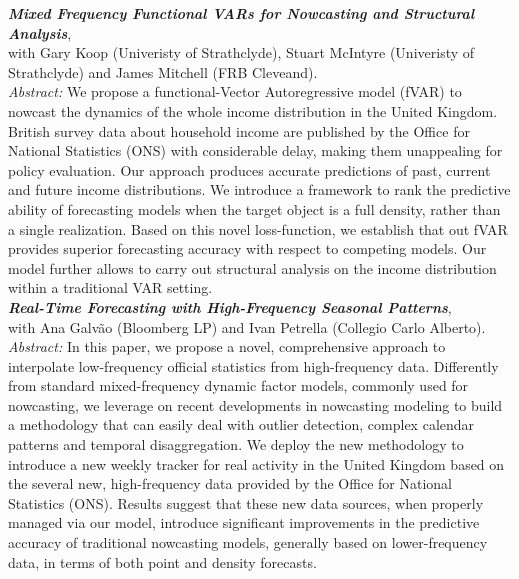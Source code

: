 \documentclass[a4paper,12pt]{article}
\begin{document}
\textit{\textbf{Mixed Frequency Functional VARs for Nowcasting and Structural Analysis}},\\ with Gary Koop (Univeristy of Strathclyde), Stuart McIntyre (Univeristy of Strathclyde) and James Mitchell (FRB Cleveand).\\[.2em]
\textit{Abstract:} We propose a functional-Vector Autoregressive model (fVAR) to nowcast the dynamics of the whole income distribution in the United Kingdom. British survey data about household income are published by the Office for National Statistics (ONS) with considerable delay, making them unappealing for policy evaluation. Our approach produces accurate predictions of past, current and future income distributions. We introduce a framework to rank the predictive ability of forecasting models when the target object is a full density, rather than a single realization. Based on this novel loss-function, we establish that out fVAR provides superior forecasting accuracy with respect to competing models. Our model further allows to carry out structural analysis on the income distribution within a traditional VAR setting.\\[.5em]

\textit{\textbf{Real-Time Forecasting with High-Frequency Seasonal Patterns}},\\ with Ana Galv\~ao (Bloomberg LP) and Ivan Petrella (Collegio Carlo Alberto).\\[.2em]
\textit{Abstract:} In this paper, we propose a novel, comprehensive approach to interpolate low-frequency official statistics from high-frequency data. Differently from standard mixed-frequency dynamic factor models, commonly used for nowcasting, we leverage on recent developments in nowcasting modeling to build a methodology that can easily deal with outlier detection, complex calendar patterns and temporal disaggregation. We deploy the new methodology to introduce a new weekly tracker for real activity in the United Kingdom based on the several new, high-frequency data provided by the Office for National Statistics (ONS). Results suggest that these new data sources, when properly managed via our model, introduce significant improvements in the predictive accuracy of traditional nowcasting models, generally based on lower-frequency data, in terms of both point and density forecasts.
\end{document}
